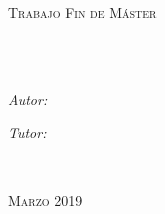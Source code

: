 \documentclass[
11pt, %
spanish,
singlespacing, %
headsepline, %
]{MastersDoctoralThesis} %
\author{José María \\ \textsc{Sánchez Salas}} %
\begin{document}
\nocite{*} %

\frontmatter %

\pagestyle{plain} %


\begin{titlepage}
\begin{center}

\vspace*{.06\textheight}
{\scshape\LARGE \univname\par}\vspace{1.5cm} %
\vspace{10mm}%
{\scshape\huge \degreename\par} \vspace{1.5cm} %
\textsc{\LARGE Trabajo Fin de Máster}\\[0.5cm] %

\vspace{10mm}
\HRule \\[0.4cm] %
{\huge \bfseries \ttitle\par}\vspace{0.4cm} %
\HRule \\[2.5cm] %
 
\begin{minipage}[t]{0.4\textwidth}
\begin{flushleft} \large
\emph{Autor:}\\
\authorname %
\end{flushleft}
\end{minipage}
\begin{minipage}[t]{0.4\textwidth}
\begin{flushright} \large
\emph{Tutor:} \\
\supname %
\end{flushright}
\end{minipage}\\[1.5cm]
 
\vfill

{\large \textsc{Marzo 2019}}\\[4cm] %
 
\vfill
\end{center}
\end{titlepage}
\end{document}
